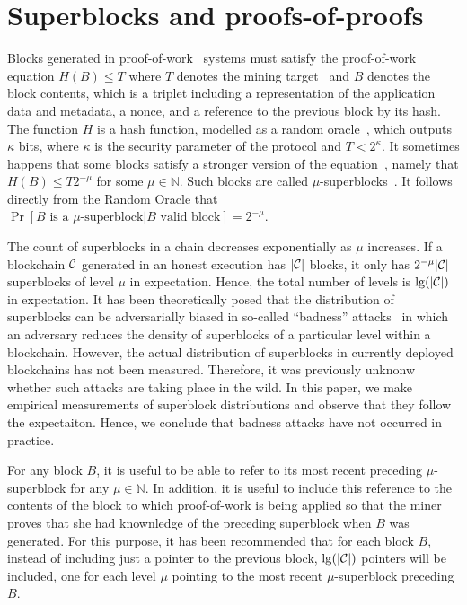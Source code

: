 \section{Superblocks and proofs-of-proofs}

Blocks generated in proof-of-work~\cite{C:DwoNao92} systems must satisfy the
proof-of-work equation $H(B) \leq T$ where $T$ denotes the mining
target~\cite{SP:BMCNKF15} and $B$ denotes the block contents, which is a triplet
including a representation of the application data and metadata, a nonce, and a
reference to the previous block by its hash. The function $H$ is a hash
function, modelled as a random oracle~\cite{CCS:BelRog93}, which outputs
$\kappa$ bits, where $\kappa$ is the security parameter of the protocol and $T <
2^\kappa$. It sometimes happens that some blocks satisfy a stronger version of
the equation~\cite{popow}, namely that $H(B) \leq T2^{-\mu}$ for some $\mu \in
\mathbb{N}$. Such blocks are called $\mu$-superblocks~\cite{nipopows}.
It follows directly from the Random Oracle that
$\Pr[B \text{ is a } \mu\text{-superblock}|B \text{ valid block}] = 2^{-\mu}$.


The count of superblocks in a chain decreases exponentially as $\mu$ increases.
If a blockchain $\mathcal{C}$ generated in an honest execution has $|\mathcal{C}|$ blocks,
it only has $2^{-\mu}|\mathcal{C}|$ superblocks of level $\mu$ in expectation. Hence,
the total number of levels is $\lg(|\mathcal{C}|)$ in expectation. It has been
theoretically posed that the distribution of superblocks can be adversarially
biased in so-called ``badness'' attacks~\cite{nipopows} in which an adversary
reduces the density of superblocks of a particular level within a blockchain.
However, the actual distribution of superblocks in currently deployed
blockchains has not been measured. Therefore, it was previously unknonw whether
such attacks are taking place in the wild. In this paper, we make empirical
measurements of superblock distributions and observe that they follow the
expectaiton. Hence, we conclude that badness attacks have not occurred in
practice.

For any block $B$,
it is useful to be able to refer to its most recent preceding $\mu$-superblock
for any $\mu \in \mathbb{N}$. In addition, it is useful to include this
reference to the contents of the block to which proof-of-work is being applied
so that the miner proves that she had knownledge of the preceding superblock
when $B$ was generated. For this purpose, it has been recommended that for each
block $B$, instead of including just a pointer to the previous block,
$\lg(|\mathcal{C}|)$ pointers will be included, one for each level $\mu$ pointing to
the most recent $\mu$-superblock preceding $B$.

